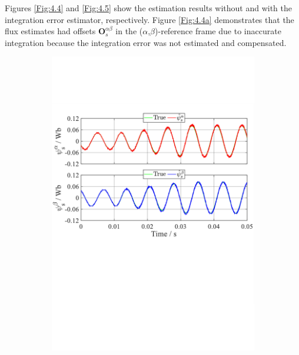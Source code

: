 Figures \ref{Fig:4.4} and \ref{Fig:4.5} show the estimation results without and with the integration error estimator, respectively. Figure \ref{Fig:4.4a} demonstrates that the flux estimates had offsets $\mathbf{O}^{\alpha\beta}_s$ in the ($\alpha$,$\beta$)-reference frame due to inaccurate integration because the integration error was not estimated and compensated. \begin{figure}[H]
    \centering
    \begin{subfigure}[b]{0.80\textwidth}
        \centering
        \includegraphics[scale=0.55]{chapters/Fig4.5a.pdf}
        \caption{}
        \label{Fig:4.5a}
    \end{subfigure}
    \vfill
    \begin{subfigure}[b]{0.80\textwidth}
        \centering

\end{subfigure}
\end{figure}
